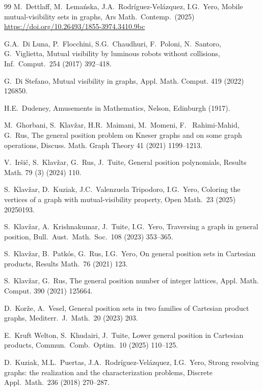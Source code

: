 \documentclass[a4paper,12pt]{article}
\theoremstyle{definition}
\begin{document}
\begin{thebibliography}{99}
		M.~Dettlaff, M.~Lema\'{n}ska, J.A.~Rodr\'{i}guez-Vel\'{a}zquez, I.G.~Yero, 
		Mobile mutual-visibility sets in graphs, 
		Ars Math.\ Contemp.\ (2025)  \url{https://doi.org/10.26493/1855-3974.3410.9bc}
		
		G.A.~Di Luna, P.~Flocchini, S.G.~Chaudhuri, F.~Poloni, N.~Santoro, G.~Viglietta, 
		Mutual visibility by luminous robots without collisions, 
		Inf.\ Comput.\ 254 (2017) 392--418. 
		
		G.~Di Stefano, Mutual visibility in graphs, 
		Appl. Math. Comput. 419 (2022) 126850.
		
		H.E.~Dudeney, 
		Amusements in Mathematics,
		Nelson, Edinburgh (1917).
		
		M.~Ghorbani, S.~Klav\v{z}ar, H.R.~Maimani, M.~Momeni, F.~ Rahimi-Mahid, G.~Rus, 
		The general position problem on Kneser graphs and on some graph operations, 
		Discuss. Math. Graph Theory 41 (2021) 1199--1213. 
		
		V.~Ir\v{s}i\v{c}, S.~Klav\v{z}ar, G.~Rus, J.~Tuite, 
		General position polynomials, 
		Results Math. 79 (3) (2024) 110.
		
		S.~Klav\v{z}ar, D.~Kuziak, J.C.~Valenzuela Tripodoro, I.G.~Yero,
		Coloring the vertices of a graph with mutual-visibility property, 
		Open Math.\ 23 (2025) 20250193. 
		
		S.~Klav\v{z}ar, A.~Krishnakumar, J.~Tuite, I.G.~Yero, 
		Traversing a graph in general position,
		Bull.\ Aust.\ Math.\ Soc.\ 108 (2023) 353--365.
		
		S.~Klav\v{z}ar, B.~Patk\'{o}s, G.~Rus, I.G.~Yero,
		On general position sets in Cartesian products, 
		Results Math.\ 76 (2021) 123. 
		
		 S.~Klav\v{z}ar, G.~Rus, The general position number of integer lattices, Appl. Math. Comput. 390 (2021) 125664.
		
		D.~Kor\v{z}e, A.~Vesel, 
		General position sets in two families of Cartesian product graphs, 
		Mediterr.\ J.\ Math.\ 20 (2023) 203.
		
		E.~Kruft Welton, S.~Khudairi, J.~Tuite, 
		Lower general position in Cartesian products, 
		Commun.\ Comb.\ Optim.\ 10 (2025) 110--125.
		
		D.~Kuziak, M.L.~Puertas, J.A.~Rodr\'iguez-Vel\'azquez, I.G.~Yero,
		Strong resolving graphs: the realization and the characterization problems,
		Discrete Appl.\ Math.\ 236 (2018) 270--287.
		

\end{thebibliography}
\end{document}
